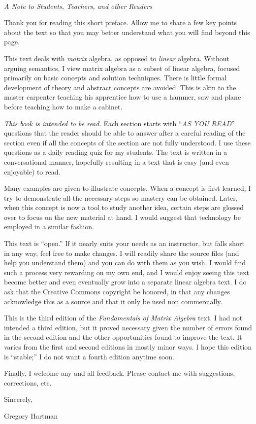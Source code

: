 \Huge
{}\\
\large
\emph{A Note to Students, Teachers, and other Readers}
\vspace{1in}
\normalsize

Thank you for reading this short preface. Allow me to share a few key points about the text so that you may better understand what you will find beyond this page.

This text deals with \emph{matrix} algebra, as opposed to \emph{linear} algebra. Without arguing semantics, I view matrix algebra as a subset of linear algebra, focused primarily on basic concepts and solution techniques. There is little formal development of theory and abstract concepts are avoided. This is akin to the master carpenter teaching his apprentice how to use a hammer, saw and plane before teaching how to make a cabinet.

\emph{This book is intended to be read.} Each section starts with ``\emph{AS YOU READ}'' questions that the reader should be able to answer after a careful reading of the section even if all the concepts of the section are not fully understood. I use these questions as a daily reading quiz for my students. The text is written in a conversational manner, hopefully resulting in a text that is easy (and even enjoyable) to read.

Many examples are given to illustrate concepts. When a concept is first learned, I try to demonstrate all the necessary steps so mastery can be obtained. Later, when this concept is now a tool to study another idea, certain steps are glossed over to focus on the new material at hand. I would suggest that technology be employed in a similar fashion.

This text is ``open.'' If it nearly suits your needs as an instructor, but falls short in any way, feel free to make changes. I will readily share the source files (and help you understand them) and you can do with them as you wish. I would find such a process very rewarding on my own end, and I would enjoy seeing this text become better and even eventually grow into a separate linear algebra text. I do ask that the Creative Commons copyright be honored, in that any changes acknowledge this as a source and that it only be used non commercially.

This is the third edition of the {\it Fundamentals of Matrix Algebra} text. I had not intended a third edition, but it proved necessary given the number of errors found in the second edition and the other opportunities found to improve the text. It varies from the first and second editions in mostly minor ways. I hope this edition is ``stable;'' I do not want a fourth edition anytime soon.%

Finally, I welcome any and all feedback. Please contact me with suggestions, corrections, etc.

Sincerely,

Gregory Hartman



